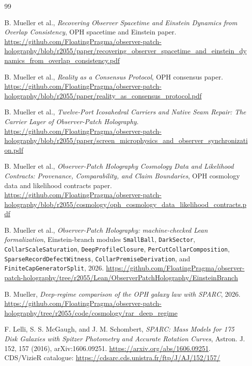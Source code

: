 \documentclass[11pt]{article}
\begin{document}
\begin{thebibliography}{99}

B. Mueller et al.,
\emph{Recovering Observer Spacetime and Einstein Dynamics from Overlap Consistency},
OPH spacetime and Einstein paper.
\url{https://github.com/FloatingPragma/observer-patch-holography/blob/r2055/paper/recovering_observer_spacetime_and_einstein_dynamics_from_overlap_consistency.pdf}

B. Mueller et al.,
\emph{Reality as a Consensus Protocol},
OPH consensus paper.
\url{https://github.com/FloatingPragma/observer-patch-holography/blob/r2055/paper/reality_as_consensus_protocol.pdf}

B. Mueller et al.,
\emph{Twelve-Port Icosahedral Carriers and Native Seam Repair: The Carrier Layer of Observer-Patch Holography}.
\url{https://github.com/FloatingPragma/observer-patch-holography/blob/r2055/paper/screen_microphysics_and_observer_synchronization.pdf}

B. Mueller et al.,
\emph{Observer-Patch Holography Cosmology Data and Likelihood Contracts: Provenance, Comparability, and Claim Boundaries},
OPH cosmology data and likelihood contracts paper.
\url{https://github.com/FloatingPragma/observer-patch-holography/blob/r2055/cosmology/oph_cosmology_data_likelihood_contracts.pdf}

B. Mueller et al.,
\emph{Observer-Patch Holography: machine-checked Lean formalization},
Einstein-branch modules \texttt{SmallBall}, \texttt{DarkSector},
\texttt{CollarScaleSaturation}, \texttt{DeepProfileClosure},
\texttt{PerCutCollarComposition}, \texttt{SparseRecordDefectWitness},
\texttt{CollarPremiseDerivation}, and \texttt{FiniteCapGeneratorSplit},
2026.
\url{https://github.com/FloatingPragma/observer-patch-holography/tree/r2055/Lean/ObserverPatchHolography/EinsteinBranch}

B. Mueller,
\emph{Deep-regime comparison of the OPH galaxy law with SPARC},
2026.
\url{https://github.com/FloatingPragma/observer-patch-holography/tree/r2055/code/cosmology/rar_deep_regime}

F. Lelli, S. S. McGaugh, and J. M. Schombert,
\emph{SPARC: Mass Models for 175 Disk Galaxies with Spitzer Photometry and Accurate Rotation Curves},
Astron. J. 152, 157 (2016), arXiv:1606.09251.
\url{https://arxiv.org/abs/1606.09251}. CDS/VizieR catalogue:
\url{https://cdsarc.cds.unistra.fr/ftp/J/AJ/152/157/}


\end{thebibliography}
\end{document}

